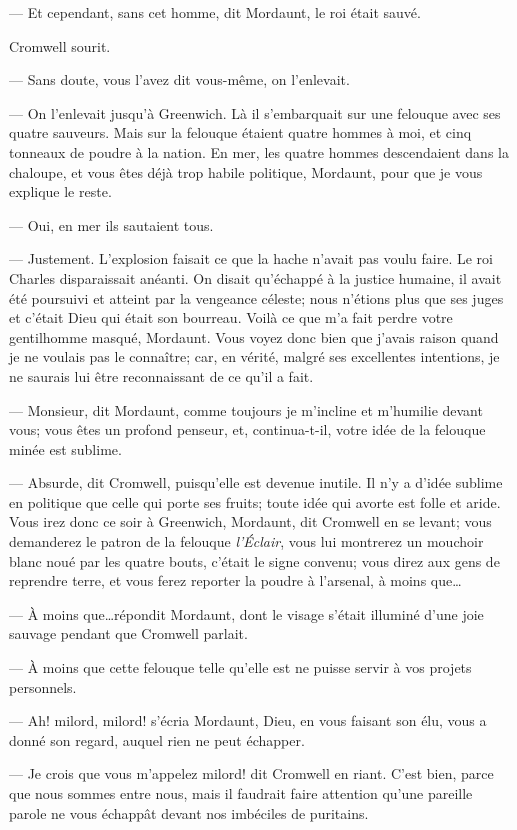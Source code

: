 — Et cependant, sans cet homme, dit Mordaunt, le roi était sauvé.

Cromwell sourit.

— Sans doute, vous l'avez dit vous-même, on l'enlevait.

— On l'enlevait jusqu'à Greenwich. Là il s'embarquait sur une felouque avec ses quatre sauveurs. Mais sur la felouque étaient quatre hommes à moi, et cinq tonneaux de poudre à la nation. En mer, les quatre hommes descendaient dans la chaloupe, et vous êtes déjà trop habile politique, Mordaunt, pour que je vous explique le reste.

— Oui, en mer ils sautaient tous.

— Justement. L'explosion faisait ce que la hache n'avait pas voulu faire. Le roi Charles disparaissait anéanti. On disait qu'échappé à la justice humaine, il avait été poursuivi et atteint par la vengeance céleste; nous n'étions plus que ses juges et c'était Dieu qui était son bourreau. Voilà ce que m'a fait perdre votre gentilhomme masqué, Mordaunt. Vous voyez donc bien que j'avais raison quand je ne voulais pas le connaître; car, en vérité, malgré ses excellentes intentions, je ne saurais lui être reconnaissant de ce qu'il a fait.

— Monsieur, dit Mordaunt, comme toujours je m'incline et m'humilie devant vous; vous êtes un profond penseur, et, continua-t-il, votre idée de la felouque minée est sublime.

— Absurde, dit Cromwell, puisqu'elle est devenue inutile. Il n'y a d'idée sublime en politique que celle qui porte ses fruits; toute idée qui avorte est folle et aride. Vous irez donc ce soir à Greenwich, Mordaunt, dit Cromwell en se levant; vous demanderez le patron de la felouque \textit{l'Éclair}, vous lui montrerez un mouchoir blanc noué par les quatre bouts, c'était le signe convenu; vous direz aux gens de reprendre terre, et vous ferez reporter la poudre à l'arsenal, à moins que\dots

— À moins que\dots répondit Mordaunt, dont le visage s'était illuminé d'une joie sauvage pendant que Cromwell parlait.

— À moins que cette felouque telle qu'elle est ne puisse servir à vos projets personnels.

— Ah! milord, milord! s'écria Mordaunt, Dieu, en vous faisant son élu, vous a donné son regard, auquel rien ne peut échapper.

— Je crois que vous m'appelez milord! dit Cromwell en riant. C'est bien, parce que nous sommes entre nous, mais il faudrait faire attention qu'une pareille parole ne vous échappât devant nos imbéciles de puritains.

